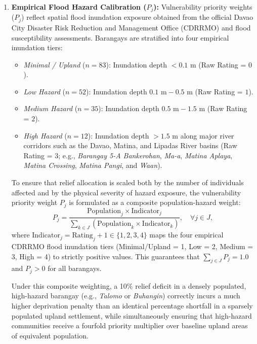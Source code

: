 \begin{enumerate}
    \item \textbf{Empirical Flood Hazard Calibration ($P_j$):} Vulnerability priority weights ($P_j$) reflect spatial flood inundation exposure obtained from the official Davao City Disaster Risk Reduction and Management Office (CDRRMO) and \citep{projectnoah2024davao} flood susceptibility assessments. Barangays are stratified into four empirical inundation tiers:
    \begin{itemize}
        \item \textit{Minimal / Upland} ($n = 83$): Inundation depth $< 0.1\text{ m}$ (Raw Rating = $0$).
        \item \textit{Low Hazard} ($n = 52$): Inundation depth $0.1\text{ m} - 0.5\text{ m}$ (Raw Rating = $1$).
        \item \textit{Medium Hazard} ($n = 35$): Inundation depth $0.5\text{ m} - 1.5\text{ m}$ (Raw Rating = $2$).
        \item \textit{High Hazard} ($n = 12$): Inundation depth $> 1.5\text{ m}$ along major river corridors such as the Davao, Matina, and Lipadas River basins (Raw Rating = $3$; e.g., \textit{Barangay 5-A Bankerohan}, \textit{Ma-a}, \textit{Matina Aplaya}, \textit{Matina Crossing}, \textit{Matina Pangi}, and \textit{Waan}).
    \end{itemize}

    To ensure that relief allocation is scaled both by the number of individuals affected and by the physical severity of hazard exposure, the vulnerability priority weight $P_j$ is formulated as a composite population-hazard weight:
\begin{equation}
    P_j = \frac{\text{Population}_j \times \text{Indicator}_j}{\sum_{k \in J} (\text{Population}_k \times \text{Indicator}_k)}, \quad \forall j \in J,
\end{equation}
where $\text{Indicator}_j = \text{Rating}_j + 1 \in \{1, 2, 3, 4\}$ maps the four empirical CDRRMO flood inundation tiers (Minimal/Upland = 1, Low = 2, Medium = 3, High = 4) to strictly positive values. This guarantees that $\sum_{j \in J} P_j = 1.0$ and $P_j > 0$ for all barangays. 

Under this composite weighting, a 10\% relief deficit in a densely populated, high-hazard barangay (e.g., \textit{Talomo} or \textit{Buhangin}) correctly incurs a much higher deprivation penalty than an identical percentage shortfall in a sparsely populated upland settlement, while simultaneously ensuring that high-hazard communities receive a fourfold priority multiplier over baseline upland areas of equivalent population.



\end{enumerate}
